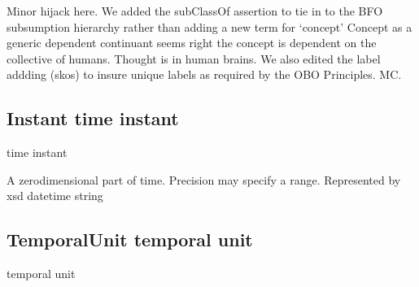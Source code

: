 \documentclass[letterpaper,10pt,english]{sphinxmanual}
\begin{document}
\begin{sphinxShadowBox}

\sphinxAtStartPar
Minor hijack here.  We added the subClassOf assertion to tie in to the BFO subsumption hierarchy rather than adding a new term for ‘concept’
Concept as a generic dependent continuant seems right \textendash{} the concept is dependent on the collective of humans.  Thought is in human brains.
We also edited the label addding (skos) to insure unique labels as required by the OBO Principles. MC.
\end{sphinxShadowBox}
\begin{quote}

\ignorespaces \end{quote}


\subsection{Instant \sphinxhyphen{} time instant}
\label{\detokenize{doc-Instant:instant-time-instant}}\label{\detokenize{doc-Instant:index-0}}\label{\detokenize{doc-Instant::doc}}
\begin{sphinxShadowBox}

\sphinxAtStartPar
time instant
\end{sphinxShadowBox}

\begin{sphinxShadowBox}

\sphinxAtStartPar
A zero\sphinxhyphen{}dimensional part of time.  Precision may specify a range.  Represented by xsd datetime string
\end{sphinxShadowBox}

\begin{sphinxShadowBox}

\sphinxAtStartPar
{}
\end{sphinxShadowBox}
\begin{quote}

\ignorespaces \end{quote}


\subsection{TemporalUnit \sphinxhyphen{} temporal unit}
\label{\detokenize{doc-TemporalUnit:temporalunit-temporal-unit}}\label{\detokenize{doc-TemporalUnit:index-0}}\label{\detokenize{doc-TemporalUnit::doc}}
\begin{sphinxShadowBox}

\sphinxAtStartPar
temporal unit
\end{sphinxShadowBox}
\end{document}
